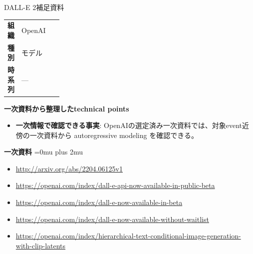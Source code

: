 \begin{technicalnote}{DALL-E 2}{補足資料}
\begingroup
\begin{tabularx}{\linewidth}{@{}>{\bfseries}p{0.22\linewidth}X@{}}
組織 & OpenAI \\
種別 & モデル \\
時系列 & — \\
\end{tabularx}
\smallskip
{\bfseries 一次資料から整理したtechnical points}
\begin{itemize}[leftmargin=1.5em,itemsep=0.35em]
\item \textbf{一次情報で確認できる事実}: OpenAIの選定済み一次資料では、対象event近傍の一次資料から autoregressive modeling を確認できる。
\end{itemize}
\begin{minipage}{\linewidth}
\begin{samepage}
{\bfseries 一次資料}
\begingroup\sloppy
\Urlmuskip=0mu plus 2mu\relax
\begin{itemize}[leftmargin=1.5em,itemsep=0.25em]
\item {\scriptsize\url{http://arxiv.org/abs/2204.06125v1}}
\item {\scriptsize\url{https://openai.com/index/dall-e-api-now-available-in-public-beta}}
\item {\scriptsize\url{https://openai.com/index/dall-e-now-available-in-beta}}
\item {\scriptsize\url{https://openai.com/index/dall-e-now-available-without-waitlist}}
\item {\scriptsize\url{https://openai.com/index/hierarchical-text-conditional-image-generation-with-clip-latents}}
\end{itemize}
\endgroup
\end{samepage}
\end{minipage}
\endgroup
\end{technicalnote}
\medskip

